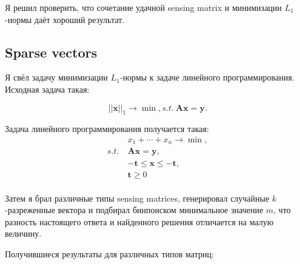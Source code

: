 \documentclass{article}
\def\*#1{\mathbf{#1}}
\begin{document}
Я решил проверить, что сочетание удачной sensing matrix и минимизации $L_1$-нормы даёт хороший результат.

\subsection{Sparse vectors}

Я свёл задачу минимизации $L_1$-нормы к задаче линейного программирования. Исходная задача такая:

$$||\*x||_1 \to \min, s.t.\ \*A\*x = \*y.$$

Задача линейного программирования получается такая:
\begin{align*}
    &x_1+\cdots+x_n \to \min, \\
s.t.\    &\*A\*x = \*y, \\
    &-\*t \leq \*x \leq -\*t, \\
    &\*t \geq 0 \\
\end{align*}

Затем я брал различные типы sensing matrices, генерировал случайные $k$-разреженные вектора и подбирал бинпоиском минимальное значение $m$, что разность настоящего ответа и найденного решения отличается на малую величину.

Получившиеся результаты для различных типов матриц:
\end{document}
